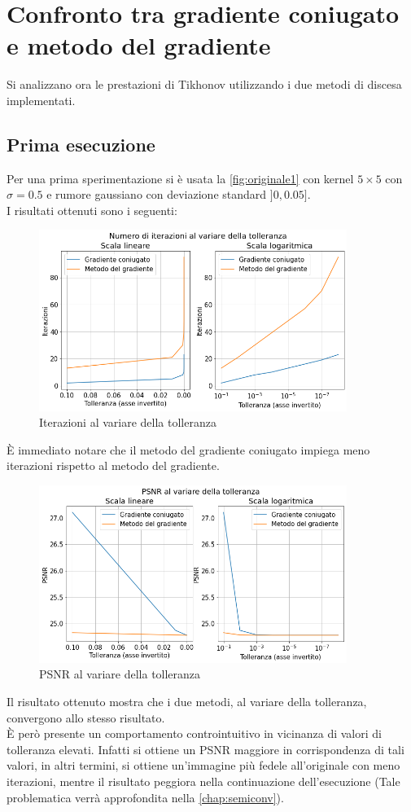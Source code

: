 \documentclass[11pt]{article}
\begin{document}
\section{Confronto tra gradiente coniugato e metodo del gradiente}
\label{chap:confronto}
Si analizzano ora le prestazioni di Tikhonov utilizzando i due metodi di discesa implementati. \\

\subsection{Prima esecuzione}
Per una prima sperimentazione si è usata la \autoref{fig:originale1} con kernel $5 \times 5$ con $\sigma=0.5$ e rumore gaussiano con deviazione standard $]0, 0.05]$.\\
I risultati ottenuti sono i seguenti:
\begin{figure}[H]
    \centering
    \includegraphics[width=10cm]{iterazioni_cg_gd/1/tol_iter.png}
    \caption{Iterazioni al variare della tolleranza}
    \label{fig:tol_iter1}
\end{figure}
È immediato notare che il metodo del gradiente coniugato impiega meno iterazioni rispetto al metodo del gradiente.\\

\begin{figure}[H]
    \centering
    \includegraphics[width=10cm]{iterazioni_cg_gd/1/tol_psnr.png}
    \caption{PSNR al variare della tolleranza}
    \label{fig:tol_psnr1}
\end{figure}
Il risultato ottenuto mostra che i due metodi, al variare della tolleranza, convergono allo stesso risultato.\\
È però presente un comportamento controintuitivo in vicinanza di valori di tolleranza elevati. 
Infatti si ottiene un PSNR maggiore in corrispondenza di tali valori, in altri termini, si ottiene un'immagine più fedele all'originale con meno iterazioni, mentre il risultato peggiora nella continuazione dell'esecuzione (Tale problematica verrà approfondita nella \autoref{chap:semiconv}).
\end{document}
